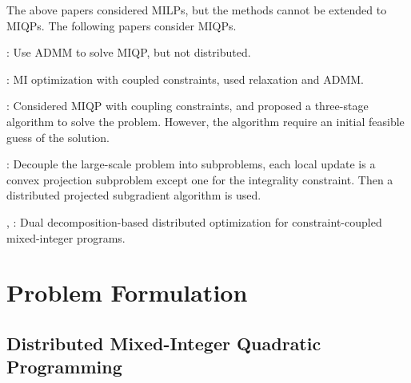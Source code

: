 \documentclass[twocolumn,amsthm]{autart}%
\theoremstyle{definition}
\theoremstyle{plain}
\begin{document}
The above papers considered MILPs, but the methods cannot be extended to MIQPs. The following papers consider MIQPs.

\cite{takapoui2020simple}: Use ADMM to solve MIQP, but not distributed.

\cite{liu2022distributed}: MI optimization with coupled constraints, used relaxation and ADMM.

\cite{liu2021distributed}: Considered MIQP with coupling constraints, and proposed a three-stage algorithm to solve the problem. However, the algorithm require an initial feasible guess of the solution.

\cite{sun2018distributed}: Decouple the large-scale problem into subproblems, each local update is a convex projection subproblem except one for the integrality constraint. Then a distributed projected subgradient algorithm is used.

\cite{yfantis2023hierarchical}, \cite{klostermeier2024numerical}: Dual decomposition-based distributed optimization for constraint-coupled mixed-integer programs.


\section{Problem Formulation}


\subsection{Distributed Mixed-Integer Quadratic Programming}
\end{document}
